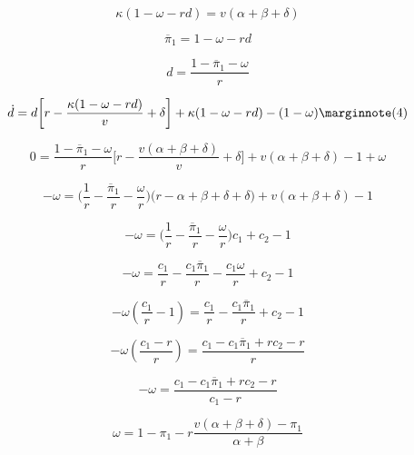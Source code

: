 \documentclass[12pt,fleqn]{article}\usepackage{../../common}
\begin{document}
$$ \kappa(1-\omega-rd)= v (\alpha + \beta + \delta)$$

$$ \overline{\pi}_1 = 1-\omega-rd  $$

$$ d = \frac{1-\overline{\pi}_1-\omega}{r} $$

$$ 
\dot{d} = d \bigg[
r - \frac{\kappa(1-\omega-rd)}{v} + \delta
\bigg] + \kappa(1-\omega-rd) - (1-\omega)
\mlabel{4}
$$


$$ 
0 =  \frac{1-\overline{\pi}_1-\omega}{r} \bigg[
r - \frac{v (\alpha + \beta + \delta)}{v} + \delta
\bigg] + v (\alpha + \beta + \delta)- 1+\omega
$$

$$ 
-\omega =  \bigg(\frac{1}{r}-\frac{\overline{\pi}_1}{r}-\frac{\omega}{r}\bigg) \bigg(
r - \alpha + \beta + \delta + \delta
\bigg) + v (\alpha + \beta + \delta)- 1
$$

$$ 
-\omega =
\bigg(\frac{1}{r}-\frac{\overline{\pi}_1}{r}-\frac{\omega}{r}\bigg)c_1 +
c_2 - 1
$$

$$ 
-\omega = \frac{c_1}{r}-\frac{c_1\overline{\pi}_1}{r}-\frac{c_1 \omega}{r}  +c_2 - 1
$$

$$ 
-\omega(\frac{c_1 }{r} -1) = \frac{c_1}{r}-\frac{c_1 \overline{\pi}_1}{r} +c_2 - 1
$$

$$ 
-\omega(\frac{c_1-r }{r}) = \frac{c_1 - c_1 \overline{\pi}_1 + rc_2 - r}{r}
$$

$$ 
-\omega = \frac{c_1 - c_1\overline{\pi}_1 + rc_2 - r}{c_1 - r}
$$







$$ \omega = 1-\pi_1-r \frac{v(\alpha+\beta+\delta) - \pi_1}{\alpha+\beta}$$
\end{document}

